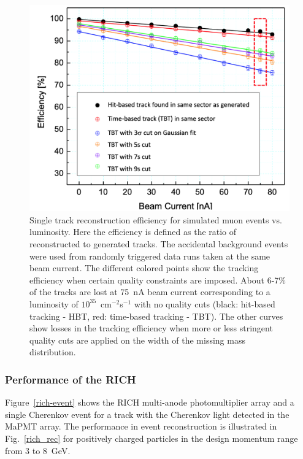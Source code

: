 \documentclass[final,3p,twocolumn]{elsarticle}
\begin{document}
\begin{figure}[t!]
\centerline{\includegraphics[width=1.0\columnwidth]{efficiencies.png}}
\caption{Single track reconstruction efficiency for simulated muon events vs. luminosity. Here the efficiency is defined
  as the ratio of reconstructed to generated tracks. The accidental background events were used from randomly
  triggered data runs taken at the same beam current. The different colored points show the tracking efficiency when
  certain quality constraints are imposed. About 6-7\% of the tracks are lost at 75~nA beam current corresponding to a
  luminosity of $10^{35}$~cm$^{-2}$s$^{-1}$ with no quality cuts (black: hit-based tracking - HBT, red: time-based tracking
  - TBT). The other curves show losses in the tracking efficiency when more or less stringent quality cuts are applied on
  the width of the missing mass distribution.}
\label{efficiencies}
\end{figure}

\subsubsection{Performance of the RICH} 

Figure~\ref{rich-event} shows the RICH multi-anode photomultiplier array and a single Cherenkov event for a track
with the Cherenkov light detected in the MaPMT array.  The performance in event reconstruction is illustrated in
Fig.~\ref{rich_rec} for positively charged particles in the design momentum range from 3 to 8~GeV. 
\end{document}
